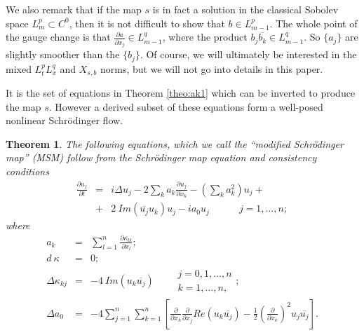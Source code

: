 \documentclass[draft,11pt,leqno]{amsart}
\newtheorem{theorem}{Theorem}
\newcommand{\qq}{\quad\quad}
\newcommand{\qqq}{\quad\quad\quad}
\newcommand{\De}{\Delta}
\newcommand{\ka}{\kappa}
\newcommand{\suml}{\sum\limits}
\newcommand{\f}{\displaystyle\frac}
\newcommand{\p}{\partial}
\newcommand{\pp}[2]{\f{\p #1}{\p #2}}
\begin{document}
We also remark that if the map $s$ is in fact a solution in the classical Sobolev 
space $L^p_m\subset C^0$, then it is not difficult to show that 
$b\in L^p_{m-1}$. The whole point of the gauge change 
is that $\pp{a}{x_j}\in L^q_{m-1}$, where the product 
$b_j\overline{b_k}\in L^q_{m-1}$. So $\{a_j\}$ are slightly smoother 
than the $\{b_j\}$.  Of course, we will ultimately be interested in the 
mixed $L_t^pL_x^q$ and $X_{s,b}$ norms, but we will not go into details in 
this paper.

It is the set of equations in Theorem \ref{theo:ak1} which can be 
inverted to produce the map $s$. However a derived subset of these equations
form a well-posed nonlinear Schr\"odinger flow.
\begin{theorem}
\label{theo:ak2}
The following equations, which we call the ``modified Schr\"odinger map'' 
(MSM) follow from the Schr\"odinger map equation and consistency conditions
\begin{eqnarray*}
\pp{u_j}{t} &=& i\De u_j-2\suml_k a_k \pp{u_j}{x_k}-
\left(\suml_k a_k^2\right)u_j+ \\
&+& 2\ Im (\overline{u_j}u_k)u_j-i a_0u_j \qqq j=1,\ldots,n;
\end{eqnarray*}
where 
\begin{eqnarray*}
a_k &=& \suml_{l=1}^n \pp{\ka_{lk}}{x_l};\\
d\ \ka &=& 0;\\
\De \ka_{kj} &=& -4\ Im(u_k\overline{u_j}) \qq\begin{array}{l}
j=0,1,\ldots,n\\
k=1,\ldots,n,
\end{array}; \\
\De a_0 &=& -4 \suml_{j=1}^n\suml_{k=1}^n \left[\pp{}{x_k}\pp{}{x_j}
Re(u_k\overline{u_j})-\f{1}{2}\left(\pp{}{x_k}\right)^2u_j\overline{u_j}
\right].
\end{eqnarray*}
\end{theorem} 
\end{document}
